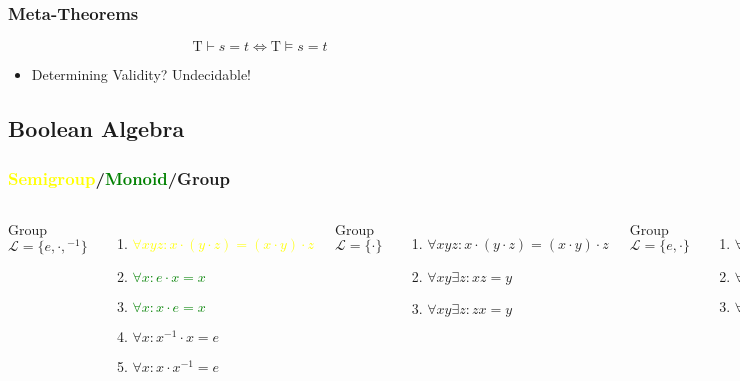 \documentclass[UTF8,11pt,colorlinks,compress,openany]{beamer}%
\begin{document}
\begin{frame}\frametitle{Meta-Theorems}
	\begin{theorem}
		\[\mathrm{T}\vdash s=t\iff\mathrm{T}\vDash s=t\]
	\end{theorem}
	\begin{itemize}
		\item Determining Validity? Undecidable!
	\end{itemize}
\end{frame}

\subsection{Boolean Algebra}

\begin{frame}\frametitle{\textcolor{yellow}{Semigroup}/\textcolor{green}{Monoid}/Group}
	\begin{columns}[onlytextwidth]
			Group $\mathscr{L}=\{e,\cdot,{}^{-1}\}$
			\begin{enumerate}
				\item \textcolor{yellow}{$\forall xyz: x\cdot(y\cdot z)=(x\cdot y)\cdot z$}
				\item \textcolor{green}{$\forall x: e\cdot x=x$}
				\item \textcolor{green}{$\forall x: x\cdot e=x$}
				\item $\forall x: x^{-1}\cdot x=e$
				\item $\forall x: x\cdot x^{-1}=e$
			\end{enumerate}
			\vspace{1ex}
			Group $\mathscr{L}=\{\cdot\}$
			\begin{enumerate}
				\item $\forall xyz: x\cdot(y\cdot z)=(x\cdot y)\cdot z$
				\item $\forall xy\exists z: xz=y$
				\item $\forall xy\exists z: zx=y$
			\end{enumerate}	
			Group $\mathscr{L}=\{e,\cdot\}$
			\begin{enumerate}
				\item $\forall xyz: x\cdot(y\cdot z)=(x\cdot y)\cdot z$
				\item $\forall x: e\cdot x=x\cdot e=x$
				\item $\forall x\exists y: x\cdot y=y\cdot x=e$
			\end{enumerate}

\end{columns}
\end{frame}
\end{document}
